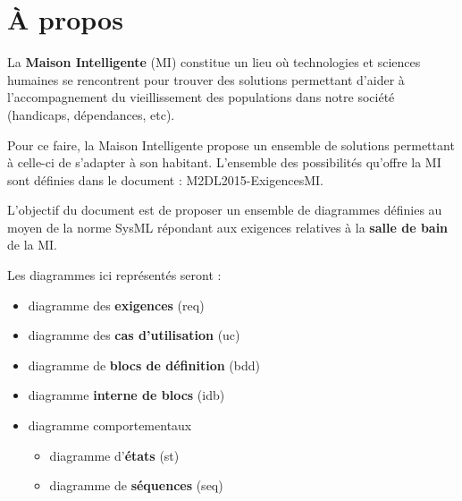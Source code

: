 \chapter*{À propos}

La \textbf{Maison Intelligente} (MI) constitue un lieu où technologies et sciences humaines se rencontrent pour trouver des solutions permettant d'aider à l'accompagnement du vieillissement des populations dans notre société (handicaps, dépendances, etc).
 
Pour ce faire, la Maison Intelligente propose un ensemble de solutions permettant à celle-ci de s'adapter à son habitant.  L'ensemble des possibilités qu'offre la MI sont définies dans le document : M2DL2015-ExigencesMI.


L'objectif du document est de proposer un ensemble de diagrammes définies au moyen de la norme SysML répondant aux exigences relatives à la \textbf{salle de bain} de la MI.

Les diagrammes ici représentés seront :
\begin{itemize}
	\item diagramme des \textbf{exigences} (req)
	\item diagramme des \textbf{cas d'utilisation} (uc)
	\item diagramme de \textbf{blocs de définition} (bdd)
	\item diagramme \textbf{interne de blocs} (idb)
	\item diagramme comportementaux
	\begin{itemize}
		\item diagramme d'\textbf{états} (st)
		\item diagramme de \textbf{séquences} (seq)
	\end{itemize}
\end{itemize} 